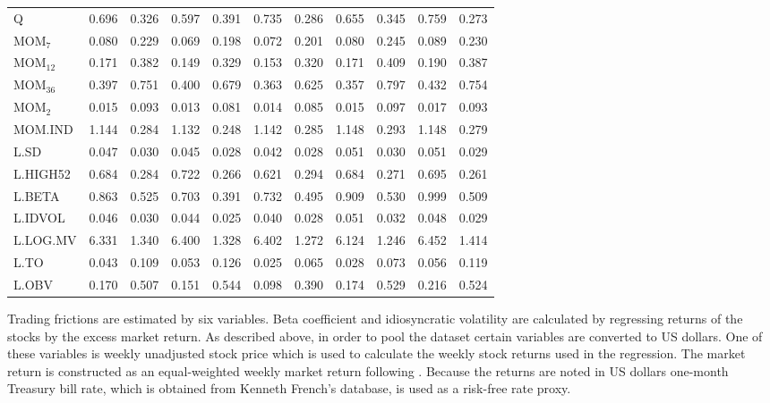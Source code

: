\documentclass[12pt]{article}
\begin{document}
\begin{table}[ht]
\begin{tabularx}{\textwidth}{@{\extracolsep{1pt}} X r r r r r r r r r r}
Q			& 0.696 	& 0.326	& 0.597 	& 0.391	& 0.735	& 0.286	& 0.655	& 0.345	& 0.759 	& 0.273 \\
MOM$_{7}$ 	& 0.080 	& 0.229	& 0.069 	& 0.198	& 0.072	& 0.201	& 0.080	& 0.245	& 0.089	& 0.230 \\
MOM$_{12}$ 	& 0.171	& 0.382	& 0.149 	& 0.329	& 0.153	& 0.320	& 0.171	& 0.409	& 0.190	& 0.387 \\
MOM$_{36}$ 	& 0.397	& 0.751	& 0.400 	& 0.679	& 0.363	& 0.625	& 0.357	& 0.797	& 0.432	& 0.754 \\
MOM$_{2}$ 	& 0.015 	& 0.093	& 0.013 	& 0.081	& 0.014	& 0.085	& 0.015	& 0.097	& 0.017	& 0.093 \\ 
MOM.IND 	& 1.144 	& 0.284	& 1.132 	& 0.248	& 1.142	& 0.285	& 1.148	& 0.293	& 1.148	& 0.279 \\
L.SD	 		& 0.047	& 0.030	& 0.045 	& 0.028	& 0.042	& 0.028	& 0.051	& 0.030	& 0.051	& 0.029 \\
L.HIGH52		& 0.684 	& 0.284	& 0.722 	& 0.266	& 0.621	& 0.294	& 0.684	& 0.271	& 0.695	& 0.261 \\
L.BETA	 	& 0.863 	& 0.525	& 0.703 	& 0.391	& 0.732	& 0.495	& 0.909	& 0.530	& 0.999	& 0.509 \\
L.IDVOL	 	& 0.046 	& 0.030	& 0.044 	& 0.025	& 0.040	& 0.028	& 0.051	& 0.032	& 0.048	& 0.029 \\ 
L.LOG.MV	& 6.331  	& 1.340	& 6.400 	& 1.328	& 6.402	& 1.272	& 6.124	& 1.246	& 6.452	& 1.414 \\ 
L.TO		 	& 0.043  	& 0.109	& 0.053 	& 0.126	& 0.025	& 0.065	& 0.028	& 0.073	& 0.056	& 0.119 \\
L.OBV		& 0.170 	& 0.507	& 0.151 	& 0.544	& 0.098	& 0.390	& 0.174	& 0.529	& 0.216	& 0.524 \\ 
\bottomrule
\end{tabularx}
\end{table} 

Trading frictions are estimated by six variables. Beta coefficient and idiosyncratic volatility are calculated by regressing returns of the stocks by the excess market return. As described above, in order to pool the dataset certain variables are converted to US dollars. One of these variables is weekly unadjusted stock price which is used to calculate the weekly stock returns used in the regression. The market return is constructed as an equal-weighted weekly market return following \citet*{Green2017}.\footnotemark {} Because the returns are noted in US dollars one-month Treasury bill rate, which is obtained from Kenneth French's database\footnotemark {}, is used as a risk-free rate proxy. \par
\end{document}
